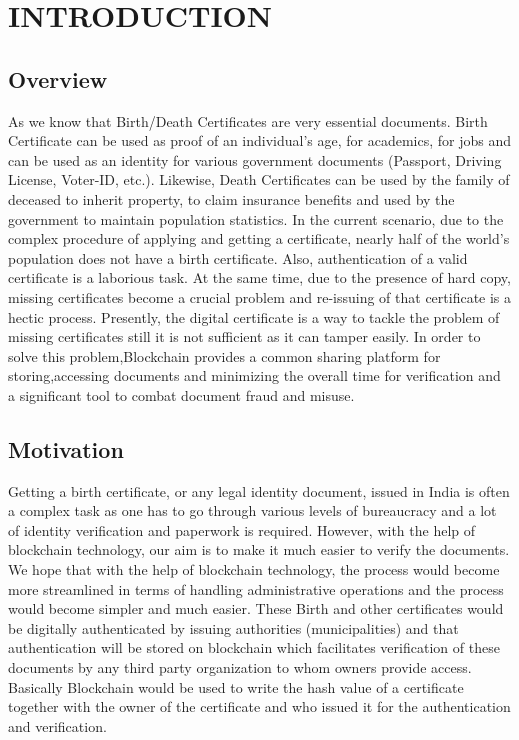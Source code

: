 \chapter{INTRODUCTION}
\section{Overview}
As we know that Birth/Death Certificates are very essential documents. Birth Certificate can be used as proof of an individual’s age, for academics, for jobs and can be used as an identity for various government documents (Passport, Driving License, Voter-ID, etc.). Likewise, Death Certificates can be used by the family of deceased to inherit property, to claim insurance benefits and used by the government to maintain population statistics. In the current scenario, due to the complex procedure of applying and getting a certificate, nearly half of the world’s population does not have a birth certificate. Also, authentication of a valid certificate is a laborious task. At the same time, due to the presence of hard copy, missing certificates become a crucial problem and re-issuing of that certificate is a hectic process. Presently, the digital certificate is a way to tackle the problem of missing certificates still it is not sufficient as it can tamper easily.
In order to solve this problem,Blockchain provides a common sharing platform for storing,accessing documents and minimizing the overall time for verification and a significant tool to combat document fraud and misuse.


\section{Motivation}
Getting a birth certificate, or any legal identity document, issued in India is often a complex task as one has to go through various levels of bureaucracy and a lot of identity verification and paperwork is required. However, with the help of blockchain technology, our aim is to make it much easier to verify the documents. We hope that with the help of blockchain technology, the process would become more streamlined in terms of handling administrative operations and the process would become simpler and much easier. These Birth and other certificates would be digitally authenticated by issuing authorities (municipalities) and that authentication will be stored on blockchain which facilitates verification of these documents by any third party organization to whom owners provide access. Basically Blockchain would be used to write the hash value of a certificate together with the owner of the certificate and who issued it for the authentication and verification.

